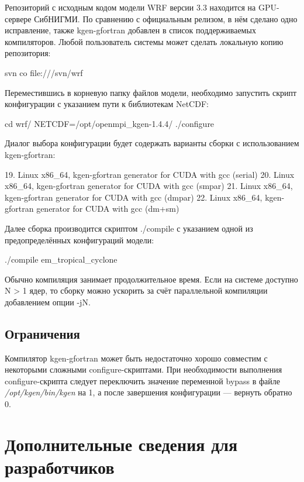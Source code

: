 \documentclass[a4,12pt]{report}
\begin{document}
Репозиторий с исходным кодом модели WRF версии 3.3 находится на GPU-сервере СибНИГМИ. По сравнению с официальным релизом, в нём сделано одно исправление, также kgen-gfortran добавлен в список поддерживаемых компиляторов. Любой пользователь системы может сделать локальную копию репозитория:

\begin{code}
svn co file:///svn/wrf
\end{code}

Переместившись в корневую папку файлов модели, необходимо запустить скрипт конфигурации с указанием пути к библиотекам NetCDF:

\begin{code}
cd wrf/
NETCDF=/opt/openmpi_kgen-1.4.4/ ./configure
\end{code}

Диалог выбора конфигурации будет содержать варианты сборки с использованием kgen-gfortran:

\begin{code}
  19.  Linux x86_64, kgen-gfortran generator for CUDA with gcc   (serial)
  20.  Linux x86_64, kgen-gfortran generator for CUDA with gcc   (smpar)
  21.  Linux x86_64, kgen-gfortran generator for CUDA with gcc   (dmpar)
  22.  Linux x86_64, kgen-gfortran generator for CUDA with gcc   (dm+sm)
\end{code}

Далее сборка производится скриптом ./compile с указанием одной из предопределённых конфигураций модели:

\begin{code}
./compile em_tropical_cyclone
\end{code}

Обычно компиляция занимает продолжительное время. Если на системе доступно N > 1 ядер, то сборку можно ускорить за счёт параллельной компиляции добавлением опции -jN.

\section{Ограничения}

Компилятор kgen-gfortran может быть недостаточно хорошо совместим с некоторыми сложными configure-скриптами. При необходимости выполнения configure-скрипта следует переключить значение переменной bypass в файле \emph{/opt/kgen/bin/kgen} на 1, а после завершения конфигурации --- вернуть обратно 0.

\chapter{Дополнительные сведения для разработчиков}
\end{document}

